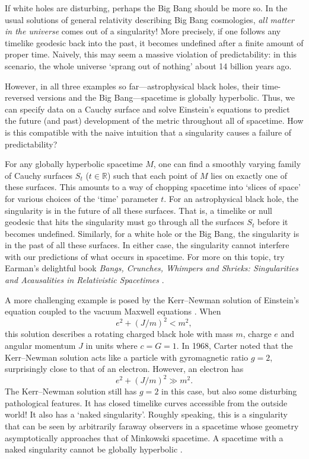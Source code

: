 \documentclass[12pt]{article}
\newcommand{\R}{\mathbb{R}}
\begin{document}
If white holes are disturbing, perhaps the Big Bang should be more so.  In the usual solutions of general relativity describing Big Bang cosmologies, \emph{all matter in the universe} comes out of a singularity!  More precisely, if one follows any timelike geodesic back into the past, it becomes undefined after a finite amount of proper time.  Naively, this may seem a massive violation of predictability: in this scenario, the whole universe `sprang out of nothing' about 14 billion years ago. 

However, in all three examples so far---astrophysical black holes, their time-reversed versions and the Big Bang---spacetime is globally hyperbolic.  Thus, we can specify data on a Cauchy surface and solve Einstein's equations to predict the future (and past) development of the metric throughout all of spacetime.   How is this compatible with the naive intuition that a singularity causes a failure of predictability?   

For any globally hyperbolic spacetime $M$, one can find a smoothly varying family of Cauchy surfaces $S_t$ ($t \in \R$) such that each point of $M$ lies on exactly one of these surfaces.  This amounts to a way of chopping spacetime into `slices of space' for various choices of the `time' parameter $t$.  For an astrophysical black hole, the singularity is in the future of all these surfaces.   That is, a timelike or null geodesic that hits the singularity must go through all the surfaces $S_t$ before it becomes undefined.  Similarly, for a white hole or the Big Bang, the singularity is in the past of all these surfaces.  In either case, the singularity cannot interfere with our predictions of what occurs in spacetime.  For more on this topic, try Earman's delightful book \textsl{Bangs, Crunches, Whimpers and Shrieks: Singularities and Acausalities in Relativistic Spacetimes} \cite{Earman}.

A more challenging example is posed by the Kerr--Newman solution of Einstein's equation
coupled to the vacuum Maxwell equations \cite{Wald1984}.     When 
\[         e^2 + (J/m)^2 < m^2 ,\]
this solution describes a rotating charged black hole with mass $m$, charge $e$ and angular momentum $J$ in units where $c = G = 1$.    In 1968, 
Carter \cite{Carter1968} noted that the Kerr--Newman solution acts like a particle with gyromagnetic ratio $g = 2$, surprisingly close to that of an electron.  However, an electron has
\[         e^2 + (J/m)^2 \gg m^2 .\]
The Kerr--Newman solution still has $g = 2$ in this case, but also some
disturbing pathological features.   It has closed timelike curves accessible from
the outside world!  It also has a `naked singularity'.  Roughly speaking, this is a singularity that can be seen by arbitrarily faraway observers in a spacetime whose geometry asymptotically approaches that of Minkowski spacetime.  A spacetime with a naked singularity cannot be globally hyperbolic \cite{HawkingEllis}.    
\end{document}
